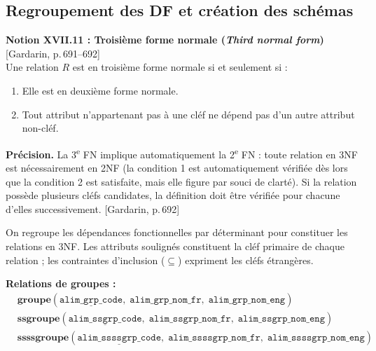 \documentclass[12pt, a4paper]{article}
\newcommand{\attr}[1]{\texttt{#1}}
\newcommand{\citeg}[1]{\textnormal{\footnotesize[#1]}}
\begin{document}

    \subsection{Regroupement des DF et création des schémas}

    \begin{rappelbox}
        \textbf{Notion XVII.11 : Troisième forme normale (\textit{Third normal form})}
        \hfill\citeg{Gardarin, p.\,691--692}\\[0.5em]
        Une relation $R$ est en troisième forme normale si et seulement si :
        \begin{enumerate}
            \item Elle est en deuxième forme normale.
            \item Tout attribut n'appartenant pas à une cléf ne dépend pas d'un autre attribut non-cléf.
        \end{enumerate}
    \end{rappelbox}

    \begin{notebox}
        \small
        \textbf{Précision.} La 3\textsuperscript{e} FN implique automatiquement la 2\textsuperscript{e} FN :
        toute relation en 3NF est nécessairement en 2NF (la condition 1 est automatiquement vérifiée dès
        lors que la condition 2 est satisfaite, mais elle figure par souci de clarté). Si la relation possède
        plusieurs cléfs candidates, la définition doit être vérifiée pour chacune d'elles
        successivement. \hfill\citeg{Gardarin, p.\,692}
    \end{notebox}

    On regroupe les dépendances fonctionnelles par déterminant pour constituer les relations en 3NF.
    Les attributs soulignés constituent la cléf primaire de chaque relation ; les contraintes d'inclusion
    ($\subseteq$) expriment les cléfs étrangères.

    \bigskip
    \noindent\textbf{Relations de groupes :}
    \begin{align*}
        &\textbf{groupe}(\underline{\attr{alim\_grp\_code}},\; \attr{alim\_grp\_nom\_fr},\; \attr{alim\_grp\_nom\_eng}) \\
        &\textbf{ssgroupe}(\underline{\attr{alim\_ssgrp\_code}},\; \attr{alim\_ssgrp\_nom\_fr},\; \attr{alim\_ssgrp\_nom\_eng}) \\
        &\textbf{ssssgroupe}(\underline{\attr{alim\_ssssgrp\_code}},\; \attr{alim\_ssssgrp\_nom\_fr},\; \attr{alim\_ssssgrp\_nom\_eng})
    \end{align*}
\end{document}
